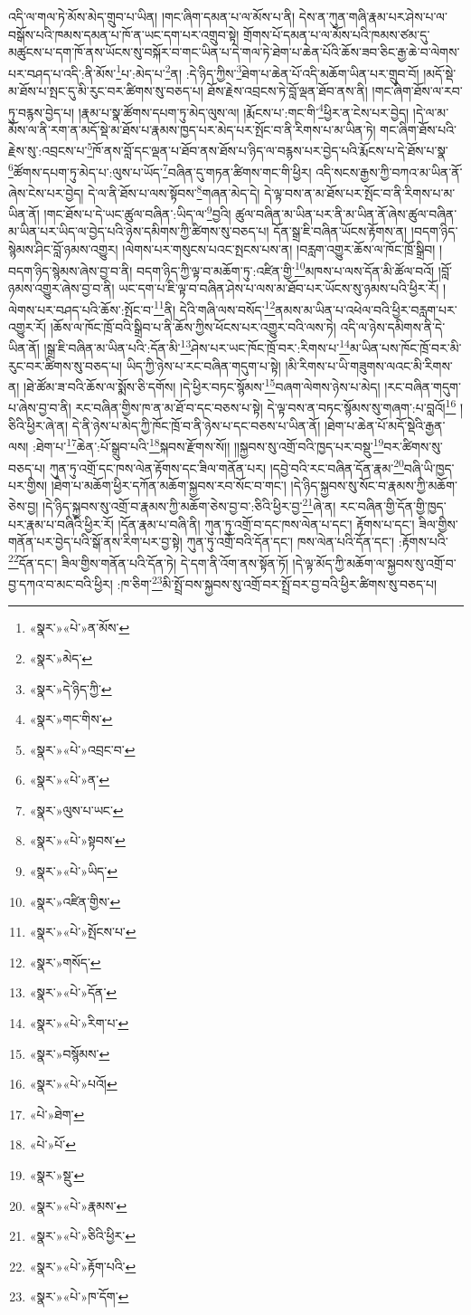 འདི་ལ་གལ་ཏེ་མོས་མེད་གྲུབ་པ་ཡིན། །གང་ཞིག་དམན་པ་ལ་མོས་པ་ནི། དེས་ན་ཀུན་གཞི་རྣམ་པར་ཤེས་པ་ལ་བསྒོས་པའི་ཁམས་དམན་པ་ཁོ་ན་ཡང་དག་པར་འགྲུབ་སྟེ། གྲོགས་པོ་དམན་པ་ལ་མོས་པའི་ཁམས་ཙམ་དུ་མཚུངས་པ་དག་ཁོ་ནས་ཡོངས་སུ་བསྐོར་བ་གང་ཡིན་པ་དེ་གལ་ཏེ་ཐེག་པ་ཆེན་པོའི་ཆོས་ཟབ་ཅིང་རྒྱ་ཆེ་བ་ལེགས་པར་བཤད་པ་འདི་:ནི་མོས་\footnote{«སྣར་»«པེ་»ན་མོས་}པ་:མེད་པ་\footnote{«སྣར་»མེད་}ན། :དེ་ཉིད་ཀྱིས་\footnote{«སྣར་»དེ་ཉིད་ཀྱི་}ཐེག་པ་ཆེན་པོ་འདི་མཆོག་ཡིན་པར་གྲུབ་བོ། །མདོ་སྡེ་མ་ཐོས་པ་སྤང་དུ་མི་རུང་བར་ཚིགས་སུ་བཅད་པ། ཐོས་རྗེས་འབྲངས་ཏེ་བློ་ལྡན་ཐོབ་ནས་ནི། །གང་ཞིག་ཐོས་ལ་རབ་ཏུ་བརྙས་བྱེད་པ། །རྣམ་པ་སྣ་ཚོགས་དཔག་ཏུ་མེད་ལུས་ལ། །རྨོངས་པ་:གང་གི་\footnote{«སྣར་»གང་གིས་}ཕྱིར་ན་ངེས་པར་བྱེད། །དེ་ལ་མ་མོས་ལ་ནི་རག་ན་མདོ་སྡེ་མ་ཐོས་པ་རྣམས་ཁྱད་པར་མེད་པར་སྤོང་བ་ནི་རིགས་པ་མ་ཡིན་ཏེ། གང་ཞིག་ཐོས་པའི་རྗེས་སུ་:འབྲངས་པ་\footnote{«སྣར་»«པེ་»འབྲང་བ་}ཁོ་ནས་བློ་དང་ལྡན་པ་ཐོབ་ནས་ཐོས་པ་ཉིད་ལ་བརྙས་པར་བྱེད་པའི་རྨོངས་པ་དེ་ཐོས་པ་སྣ་\footnote{«སྣར་»«པེ་»ན་}ཚོགས་དཔག་ཏུ་མེད་པ་:ལུས་པ་ཡོད་\footnote{«སྣར་»ལུས་པ་ཡང་}བཞིན་དུ་གཏན་ཚིགས་གང་གི་ཕྱིར། འདི་སངས་རྒྱས་ཀྱི་བཀའ་མ་ཡིན་ནོ་ཞེས་ངེས་པར་བྱེད། དེ་ལ་ནི་ཐོས་པ་ལས་སྟོབས་\footnote{«སྣར་»«པེ་»སྟབས་}གཞན་མེད་དེ། དེ་ལྟ་བས་ན་མ་ཐོས་པར་སྤོང་བ་ནི་རིགས་པ་མ་ཡིན་ནོ། །གང་ཐོས་པ་དེ་ཡང་ཚུལ་བཞིན་:ཡིད་ལ་\footnote{«སྣར་»«པེ་»ཡིད་}བྱའི། ཚུལ་བཞིན་མ་ཡིན་པར་ནི་མ་ཡིན་ནོ་ཞེས་ཚུལ་བཞིན་མ་ཡིན་པར་ཡིད་ལ་བྱེད་པའི་ཉེས་དམིགས་ཀྱི་ཚིགས་སུ་བཅད་པ། དོན་སྒྲ་ཇི་བཞིན་ཡོངས་རྟོགས་ན། །བདག་ཉིད་སྙེམས་ཤིང་བློ་ཉམས་འགྱུར། །ལེགས་པར་གསུངས་པའང་སྤངས་པས་ན། །བརླག་འགྱུར་ཆོས་ལ་ཁོང་ཁྲོ་སྒྲིབ། །བདག་ཉིད་སྙེམས་ཞེས་བྱ་བ་ནི། བདག་ཉིད་ཀྱི་ལྟ་བ་མཆོག་ཏུ་:འཛིན་གྱི་\footnote{«སྣར་»འཛིན་གྱིས་}མཁས་པ་ལས་དོན་མི་ཚོལ་བའོ། །བློ་ཉམས་འགྱུར་ཞེས་བྱ་བ་ནི། ཡང་དག་པ་ཇི་ལྟ་བ་བཞིན་ཤེས་པ་ལས་མ་ཐོབ་པར་ཡོངས་སུ་ཉམས་པའི་ཕྱིར་རོ། །ལེགས་པར་བཤད་པའི་ཆོས་:སྤོང་བ་\footnote{«སྣར་»«པེ་»སྤོངས་པ་}ནི། དེའི་གཞི་ལས་བསོད་\footnote{«སྣར་»གསོད་}ནམས་མ་ཡིན་པ་འཕེལ་བའི་ཕྱིར་བརླག་པར་འགྱུར་རོ། །ཆོས་ལ་ཁོང་ཁྲོ་བའི་སྒྲིབ་པ་ནི་ཆོས་ཀྱིས་ཕོངས་པར་འགྱུར་བའི་ལས་ཏེ། འདི་ལ་ཉེས་དམིགས་ནི་དེ་ཡིན་ནོ། །སྒྲ་ཇི་བཞིན་མ་ཡིན་པའི་:དོན་མི་\footnote{«སྣར་»«པེ་»དོན་}ཤེས་པར་ཡང་ཁོང་ཁྲོ་བར་:རིགས་པ་\footnote{«སྣར་»«པེ་»རིག་པ་}མ་ཡིན་པས་ཁོང་ཁྲོ་བར་མི་རུང་བར་ཚིགས་སུ་བཅད་པ། ཡིད་ཀྱི་ཉེས་པ་རང་བཞིན་གདུག་པ་སྟེ། །མི་རིགས་པ་ཡི་གཟུགས་ལའང་མི་རིགས་ན། །ཐེ་ཚོམ་ཟ་བའི་ཆོས་ལ་སྨོས་ཅི་དགོས། །དེ་ཕྱིར་བཏང་སྙོམས་\footnote{«སྣར་»བསྙོམས་}བཞག་ལེགས་ཉེས་པ་མེད། །རང་བཞིན་གདུག་པ་ཞེས་བྱ་བ་ནི། རང་བཞིན་གྱིས་ཁ་ན་མ་ཐོ་བ་དང་བཅས་པ་སྟེ། དེ་ལྟ་བས་ན་བཏང་སྙོམས་སུ་གཞག་:པ་བླའོ།\footnote{«སྣར་»«པེ་»པའོ།} །ཅིའི་ཕྱིར་ཞེ་ན། དེ་ནི་ཉེས་པ་མེད་ཀྱི་ཁོང་ཁྲོ་བ་ནི་ཉེས་པ་དང་བཅས་པ་ཡིན་ནོ། །ཐེག་པ་ཆེན་པོ་མདོ་སྡེའི་རྒྱན་ལས། :ཐེག་པ་\footnote{«པེ་»ཐེག་}ཆེན་:པོ་སྒྲུབ་པའི་\footnote{«པེ་»པོ་}སྐབས་རྫོགས་སོ།། །།སྐྱབས་སུ་འགྲོ་བའི་ཁྱད་པར་བསྡུ་\footnote{«སྣར་»སྡུ་}བར་ཚིགས་སུ་བཅད་པ། ཀུན་ཏུ་འགྲོ་དང་ཁས་ལེན་རྟོགས་དང་ཟིལ་གནོན་པར། །དབྱེ་བའི་རང་བཞིན་དོན་རྣམ་\footnote{«སྣར་»«པེ་»རྣམས་}བཞི་ཡི་ཁྱད་པར་གྱིས། །ཐེག་པ་མཆོག་ཕྱིར་དཀོན་མཆོག་སྐྱབས་རབ་སོང་བ་གང་། །དེ་ཉིད་སྐྱབས་སུ་སོང་བ་རྣམས་ཀྱི་མཆོག་ཅེས་བྱ། །དེ་ཉིད་སྐྱབས་སུ་འགྲོ་བ་རྣམས་ཀྱི་མཆོག་ཅེས་བྱ་བ་:ཅིའི་ཕྱིར་བྱ་\footnote{«སྣར་»«པེ་»ཅིའི་ཕྱིར་}ཞེ་ན། རང་བཞིན་གྱི་དོན་གྱི་ཁྱད་པར་རྣམ་པ་བཞིའི་ཕྱིར་རོ། །དོན་རྣམ་པ་བཞི་ནི། ཀུན་ཏུ་འགྲོ་བ་དང་ཁས་ལེན་པ་དང་། རྟོགས་པ་དང་། ཟིལ་གྱིས་གནོན་པར་བྱེད་པའི་སྒོ་ནས་རིག་པར་བྱ་སྟེ། ཀུན་ཏུ་འགྲོ་བའི་དོན་དང་། ཁས་ལེན་པའི་དོན་དང་། :རྟོགས་པའི་\footnote{«སྣར་»«པེ་»རྟོག་པའི་}དོན་དང་། ཟིལ་གྱིས་གནོན་པའི་དོན་ཏེ། དེ་དག་ནི་འོག་ནས་སྟོན་ཏོ། །དེ་ལྟ་མོད་ཀྱི་མཆོག་ལ་སྐྱབས་སུ་འགྲོ་བ་བྱ་དཀའ་བ་མང་བའི་ཕྱིར། :ཁ་ཅིག་\footnote{«སྣར་»«པེ་»ཁ་དོག་}མི་སྤྲོ་བས་སྐྱབས་སུ་འགྲོ་བར་སྤྲོ་བར་བྱ་བའི་ཕྱིར་ཚིགས་སུ་བཅད་པ། 
